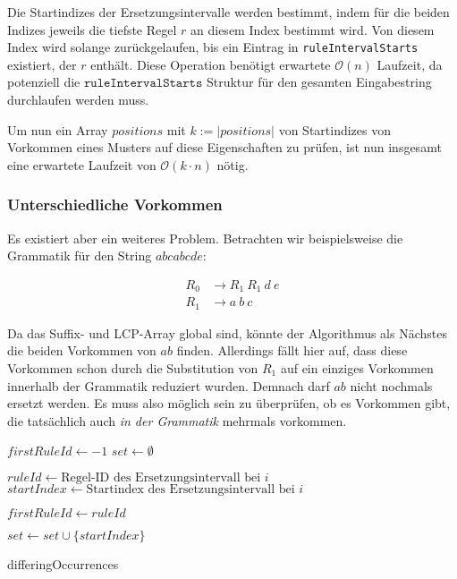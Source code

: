 Die Startindizes der Ersetzungsintervalle werden bestimmt, indem für die beiden Indizes jeweils die tiefste Regel $r$ an diesem Index bestimmt wird. Von diesem Index wird solange zurückgelaufen, bis ein Eintrag in \texttt{ruleIntervalStarts} existiert, der $r$ enthält. Diese Operation benötigt erwartete $\mathcal{O}(n)$ Laufzeit, da potenziell die $\texttt{ruleIntervalStarts}$ Struktur für den gesamten Eingabestring durchlaufen werden muss.

Um nun ein Array $positions$ mit $k := |positions|$ von Startindizes von Vorkommen eines Musters auf diese Eigenschaften zu prüfen, ist nun insgesamt eine erwartete Laufzeit von $\mathcal{O}(k \cdot n)$ nötig.

\subsubsection{Unterschiedliche Vorkommen}

Es existiert aber ein weiteres Problem. Betrachten wir beispielsweise die Grammatik für den String $abcabcde$:

\begin{align*}
	R_0 &\rightarrow R_1\ R_1\ d\ e\\
	R_1 &\rightarrow a\ b\ c
\end{align*}

Da das Suffix- und LCP-Array global sind, könnte der Algorithmus als Nächstes die beiden Vorkommen von $ab$ finden. 
Allerdings fällt hier auf, dass diese Vorkommen schon durch die Substitution von $R_1$ auf ein einziges Vorkommen innerhalb der Grammatik reduziert wurden. Demnach darf $ab$ nicht nochmals ersetzt werden. 
Es muss also möglich sein zu überprüfen, ob es Vorkommen gibt, die tatsächlich auch \emph{in der Grammatik} mehrmals vorkommen.
\begin{algorithm}[t]
    $firstRuleId \leftarrow -1$\;
    $set \leftarrow \emptyset$\;
     {
        $ruleId \leftarrow \text{Regel-ID des Ersetzungsintervall bei } i$\;
        $startIndex \leftarrow \text{Startindex des Ersetzungsintervall bei } i$\;
        
         {
            $firstRuleId \leftarrow ruleId$\;
        }
         {
            \;
        }
            
        $set \leftarrow set \cup \{startIndex\}$\;
    }
    \;
    \caption{differingOccurrences}
    \label{diffOccAlgoV2}
\end{algorithm}

